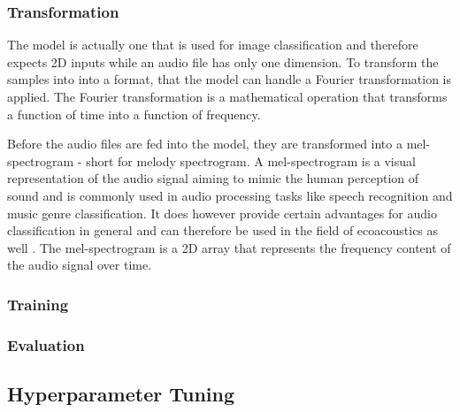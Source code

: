 \subsubsection{Transformation}
The model is actually one that is used for image classification and therefore expects
2D inputs while an audio file has only one dimension. To transform the samples into
into a format, that the model can handle a Fourier transformation is applied.
The Fourier transformation is a mathematical operation that transforms a function of time
into a function of frequency.

Before the audio files are fed into the model, they are transformed into a mel-spectrogram -
short for melody spectrogram. A mel-spectrogram is a visual representation of the audio signal 
aiming to mimic the human perception of sound and is commonly used in audio processing tasks like
speech recognition and music genre classification. It does however provide certain advantages
for audio classification in general and can therefore be used in the field of ecoacoustics as well \autocite[7]{stowellComputationalBioacousticsDeep2022}.
The mel-spectrogram is a 2D array that represents the frequency content of the audio signal over time.







\subsubsection{Training}


\subsubsection{Evaluation}


\subsection{Hyperparameter Tuning}